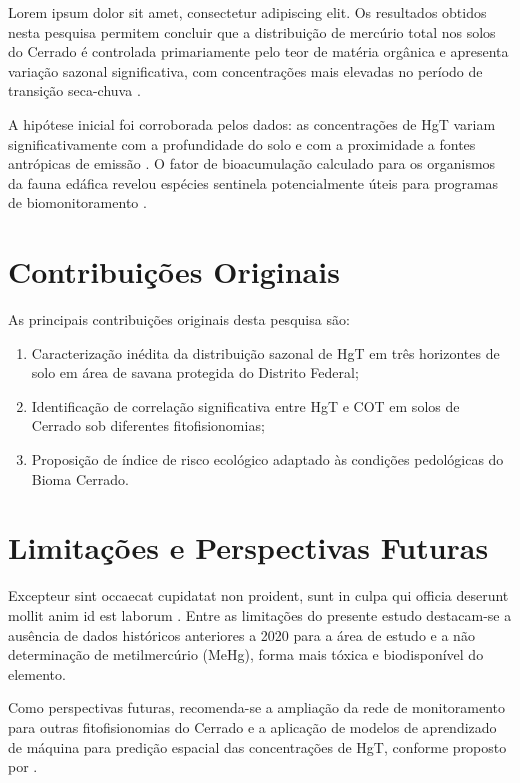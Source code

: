 
Lorem ipsum dolor sit amet, consectetur adipiscing elit. Os resultados
obtidos nesta pesquisa permitem concluir que a distribuição de mercúrio
total nos solos do Cerrado é controlada primariamente pelo teor de
matéria orgânica e apresenta variação sazonal significativa, com
concentrações mais elevadas no período de transição seca-chuva
\cite{exemplo:artigo:2024}.

A hipótese inicial foi corroborada pelos dados: as concentrações de HgT
variam significativamente com a profundidade do solo e com a proximidade
a fontes antrópicas de emissão \cite{exemplo:tese:2023}. O fator de
bioacumulação calculado para os organismos da fauna edáfica revelou
espécies sentinela potencialmente úteis para programas de biomonitoramento
\cite{exemplo:anais:2023}.

\section{Contribuições Originais}

As principais contribuições originais desta pesquisa são:

\begin{enumerate}
  \item Caracterização inédita da distribuição sazonal de HgT em
        três horizontes de solo em área de savana protegida do
        Distrito Federal;
  \item Identificação de correlação significativa entre HgT e COT
        em solos de Cerrado sob diferentes fitofisionomias;
  \item Proposição de índice de risco ecológico adaptado às
        condições pedológicas do Bioma Cerrado.
\end{enumerate}

\section{Limitações e Perspectivas Futuras}

Excepteur sint occaecat cupidatat non proident, sunt in culpa qui
officia deserunt mollit anim id est laborum \cite{exemplo:livro:2020}.
Entre as limitações do presente estudo destacam-se a ausência de dados
históricos anteriores a 2020 para a área de estudo e a não determinação
de metilmercúrio (MeHg), forma mais tóxica e biodisponível do elemento.

Como perspectivas futuras, recomenda-se a ampliação da rede de
monitoramento para outras fitofisionomias do Cerrado e a aplicação de
modelos de aprendizado de máquina para predição espacial das concentrações
de HgT, conforme proposto por .
